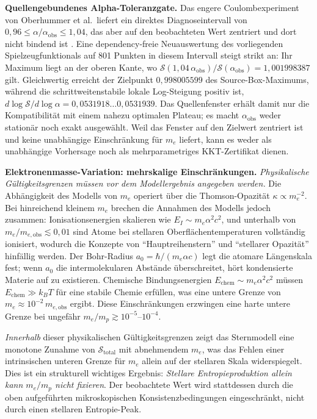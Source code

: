 \documentclass[12pt,a4paper]{article}
\theoremstyle{remark}
\begin{document}
\textbf{Quellengebundenes Alpha-Toleranzgate.} Das engere Coulombexperiment von Oberhummer et al.\ liefert ein direktes Diagnoseintervall von $0{,}96\leq\alpha/\alpha_{\mathrm{obs}}\leq1{,}04$, das aber auf den beobachteten Wert zentriert und dort nicht bindend ist \citep{Oberhummer2000}. Eine dependency-freie Neuauswertung des vorliegenden Spielzeugfunktionals auf 801 Punkten in diesem Intervall steigt strikt an: Ihr Maximum liegt an der oberen Kante, wo $\mathcal{S}(1{,}04\,\alpha_{\mathrm{obs}})/\mathcal{S}(\alpha_{\mathrm{obs}})=1{,}001998387$ gilt. Gleichwertig erreicht der Zielpunkt $0{,}998005599$ des Source-Box-Maximums, w\"ahrend die schrittweitenstabile lokale Log-Steigung positiv ist, $d\log\mathcal{S}/d\log\alpha=0{,}0531918\ldots0{,}0531939$. Das Quellenfenster erh\"alt damit nur die Kompatibilit\"at mit einem nahezu optimalen Plateau; es macht $\alpha_{\mathrm{obs}}$ weder station\"ar noch exakt ausgew\"ahlt. Weil das Fenster auf den Zielwert zentriert ist und keine unabh\"angige Einschr\"ankung f\"ur $m_e$ liefert, kann es weder als unabh\"angige Vorhersage noch als mehrparametriges KKT-Zertifikat dienen.

\textbf{Elektronenmasse-Variation: mehrskalige Einschr\"ankungen.} \emph{Physikalische G\"ultigkeitsgrenzen m\"ussen vor dem Modellergebnis angegeben werden.} Die Abh\"angigkeit des Modells von $m_e$ operiert \"uber die Thomson-Opazit\"at $\kappa \propto m_e^{-2}$. Bei hinreichend kleinem $m_e$ brechen die Annahmen des Modells jedoch zusammen: Ionisationsenergien skalieren wie $E_I \sim m_e \alpha^2 c^2$, und unterhalb von $m_e/m_{e,\text{obs}} \lesssim 0{,}01$ sind Atome bei stellaren Oberfl\"achentemperaturen vollst\"andig ionisiert, wodurch die Konzepte von ``Hauptreihenstern'' und ``stellarer Opazit\"at'' hinf\"allig werden. Der Bohr-Radius $a_0 = \hbar/(m_e \alpha c)$ legt die atomare L\"angenskala fest; wenn $a_0$ die intermolekularen Abst\"ande \"uberschreitet, h\"ort kondensierte Materie auf zu existieren. Chemische Bindungsenergien $E_{\text{chem}} \sim m_e \alpha^2 c^2$ m\"ussen $E_{\text{chem}} \gg k_B T$ f\"ur eine stabile Chemie erf\"ullen, was eine untere Grenze von $m_e \approx 10^{-2}\,m_{e,\text{obs}}$ ergibt. Diese Einschr\"ankungen erzwingen eine harte untere Grenze bei ungef\"ahr $m_e/m_p \gtrsim 10^{-5}$--$10^{-4}$.

\emph{Innerhalb} dieser physikalischen G\"ultigkeitsgrenzen zeigt das Sternmodell eine monotone Zunahme von $\mathcal{S}_{\text{total}}$ mit abnehmendem $m_e$, was das Fehlen einer intrinsischen unteren Grenze f\"ur $m_e$ allein auf der stellaren Skala widerspiegelt. Dies ist ein strukturell wichtiges Ergebnis: \emph{Stellare Entropieproduktion allein kann $m_e/m_p$ nicht fixieren}. Der beobachtete Wert wird stattdessen durch die oben aufgef\"uhrten mikroskopischen Konsistenzbedingungen eingeschr\"ankt, nicht durch einen stellaren Entropie-Peak.
\end{document}
